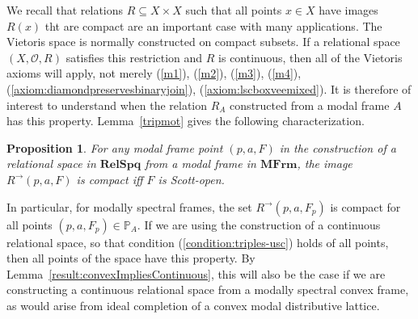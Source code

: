\documentclass{article}[a4paper]
\newtheorem{proposition}{Proposition}%
\theoremstyle{definition}
\newcommand{\Ocal}{\mathcal{O}} %
\newcommand{\relspq}{\mathbf{RelSpq}}
\newcommand{\mfrm}{\mathbf{MFrm}}
\newcommand{\Pbb}{\mathbb{P}}
\newcommand{\dirim}{^{\rightarrow\!}}
\begin{document}
We recall that relations $R\subseteq X \times X$ such that all points $x \in X$ have images $R(x)$ tht are compact are an important case with many applications. The Vietoris space is normally constructed on compact subsets. If a relational space $(X,\Ocal,R)$ satisfies this restriction and $R$ is continuous, then all of the Vietoris axioms will apply, not merely (\ref{m1}), (\ref{m2}), (\ref{m3}), (\ref{m4}), (\ref{axiom:diamondpreservesbinaryjoin}), (\ref{axiom:lscboxveemixed}). It is therefore of interest to understand when the relation $R_A$ constructed from a modal frame $A$ has this property. Lemma~\ref{tripmot} gives the following characterization.
\begin{proposition}
For any modal frame point $(p,a,F)$ in the construction of a relational space in $\relspq$ from a modal frame in $\mfrm$, the image $R\dirim (p,a,F)$ is compact iff $F$ is Scott-open. 
\end{proposition}
In particular, for modally spectral frames, the set  
$R\dirim (p , a, F_p )$
is compact for all points 
$(p,a,F_p) \in \Pbb_A$. 
If we are using the construction of a continuous relational space, so that condition (\ref{condition:triples-usc}) holds of all points, then all points of the space have this property. By Lemma~\ref{result:convexImpliesContinuous}, this will also be the case if we are constructing a continuous relational space from a modally spectral convex frame, as would arise from ideal completion of a convex modal distributive lattice.



\end{document}
